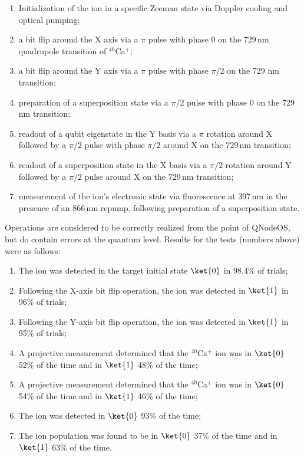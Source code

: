 \begin{enumerate}
\item Initialization of the ion in a specific Zeeman state via Doppler cooling and optical pumping;
\item a bit flip around the X axis via a $\pi$ pulse with phase 0 on the 729\,nm quadrupole transition of $^{40}$Ca$^+$;
\item a bit flip around the Y axis via a $\pi$ pulse with phase $\pi/2$ on the 729 nm transition;
\item preparation of a superposition state via a $\pi/2$ pulse with phase 0 on the 729\,nm transition;
\item readout of a qubit eigenstate in the Y basis via a $\pi$ rotation around X followed by a $\pi/2$ pulse with phase $\pi/2$ around X on the 729\,nm transition;
\item readout of a superposition state in the X basis via a $\pi/2$ rotation around Y followed by a $\pi/2$ pulse around X on the 729\,nm transition;
\item measurement of the ion's electronic state via fluorescence at 397\,nm in the presence of an 866\,nm repump, following preparation of a superposition state.
\end{enumerate}

Operations are considered to be correctly realized from the point of \ac{QNodeOS}, but do contain errors at the quantum level. Results for the tests (numbers above) were as follows:
%
\begin{enumerate}
\item The ion was detected in the target initial state $\ket{0}$ in 98.4\% of trials;
\item Following the X-axis bit flip operation, the ion was detected in $\ket{1}$ in 96\% of trials;
\item Following the Y-axis bit flip operation, the ion was detected in $\ket{1}$ in 95\% of trials;
\item A projective measurement determined that the $^{40}$Ca$^{+}$ ion was in $\ket{0}$ 52\% of the time and in $\ket{1}$ 48\% of the time;
\item A projective measurement determined that the $^{40}$Ca$^{+}$ ion was in $\ket{0}$ 54\% of the time and in $\ket{1}$ 46\% of the time;
\item The ion was detected in $\ket{0}$ 93\% of the time;
\item The ion population was found to be in $\ket{0}$ 37\% of the time and in $\ket{1}$ 63\% of the time.
\end{enumerate}

